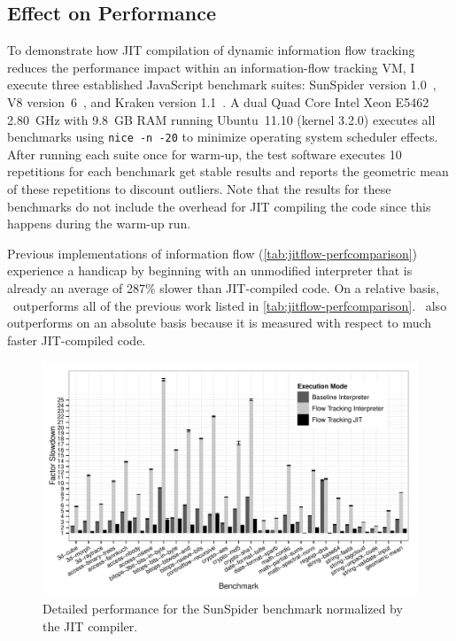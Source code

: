\subsection{Effect on Performance}
\label{sec:jitflow-evaluation-performance}

To demonstrate how JIT compilation of dynamic information flow tracking reduces the performance impact within an information-flow tracking VM, I execute three established JavaScript benchmark suites:
SunSpider version 1.0~\cite{sunspider}, V8 version~6~\cite{v8}, and Kraken version 1.1~\cite{kraken}.
A dual Quad Core Intel Xeon E5462 2.80~GHz with 9.8~GB RAM running Ubuntu~11.10 (kernel 3.2.0) executes all benchmarks using \texttt{nice~-n~-20} to minimize operating system scheduler effects.
After running each suite once for warm-up, the test software executes 10 repetitions for each benchmark get stable results and reports the geometric mean of these repetitions to discount outliers.
Note that the results for these benchmarks do not include the overhead for JIT compiling the code since this happens during the warm-up run.

Previous implementations of information flow (\autoref{tab:jitflow-perfcomparison}) experience a handicap by beginning with an unmodified interpreter that is already an average of 287\% slower than JIT-compiled code.
On a relative basis, \JitFlow\ outperforms all of the previous work listed in \autoref{tab:jitflow-perfcomparison}.
\JitFlow\ also outperforms on an absolute basis because it is measured with respect to much faster JIT-compiled code.

\begin{figure}[ht]
  \centerline{\includegraphics[width=\linewidth,keepaspectratio=true]{graphics/sunspider_plot.pdf}}
  \caption{Detailed performance for the SunSpider benchmark normalized by the  JIT compiler.}
   \label{fig:sunspider-performance}
\end{figure}

